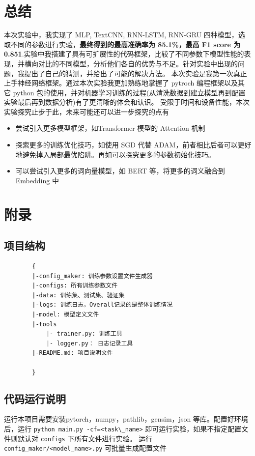 \documentclass{article}
\begin{document}
\begin{spacing}{1.1}
\section{总结}
	\hspace{1.4em}
	本次实验中，我实现了 MLP, TextCNN, RNN-LSTM, RNN-GRU 四种模型，选取不同的参数进行实验，\textbf{最终得到的最高准确率为 85.1\%，最高 F1 score 为 0.851}.实验中我搭建了具有可扩展性的代码框架，比较了不同参数下模型性能的表现，并横向对比的不同模型，分析他们各自的优势与不足。针对实验中出现的问题，我提出了自己的猜测，并给出了可能的解决方法。
	本次实验是我第一次真正上手神经网络框架。通过本次实验我更加熟练地掌握了 pytroch 编程框架以及其它 python 包的使用，并对机器学习训练的过程(从清洗数据到建立模型再到配置实验最后再到数据分析)有了更清晰的体会和认识。
	受限于时间和设备性能，本次实验探究止步于此，未来可能还可以进一步探究的点有
	\begin{itemize}
		\item 尝试引入更多模型框架，如Transformer 模型的 Attention 机制
		\item 探索更多的训练优化技巧，如使用 SGD 代替 ADAM，前者相比后者可以更好地避免掉入局部最优陷阱。再如可以探究更多的参数初始化技巧。
		\item 可以尝试引入更多的词向量模型，如 BERT 等，将更多的词义融合到 Embedding 中
	\end{itemize}
\section{附录}
	\subsection{项目结构}
		\begin{lstlisting}
		{
		|-config_maker: 训练参数设置文件生成器
		|-configs: 所有训练参数文件
		|-data: 训练集、测试集、验证集
		|-logs: 训练日志，Overall记录的是整体训练情况
		|-model: 模型定义文件
		|-tools
			|- trainer.py: 训练工具
			|- logger.py： 日志记录工具
		|-README.md: 项目说明文件
		
		}
		\end{lstlisting}
	\subsection{代码运行说明}
	\hspace{1.4em}
		运行本项目需要安装pytorch，numpy，pathlib，gensim，json 等库。配置好环境后，运行 \verb|python main.py -cf=<task\_name>| 即可运行实验，如果不指定配置文件则默认对 \verb|configs| 下所有文件进行实验。
		运行 \verb|config_maker/<model_name>.py| 可批量生成配置文件
	

\end{spacing}
\end{document}

